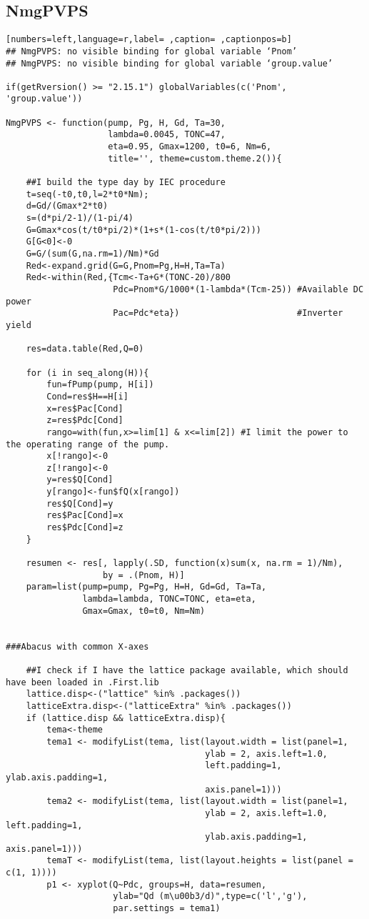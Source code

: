 \subsection{NmgPVPS}
\label{sec:org3b84132}
\begin{lstlisting}[numbers=left,language=r,label= ,caption= ,captionpos=b]
## NmgPVPS: no visible binding for global variable ‘Pnom’
## NmgPVPS: no visible binding for global variable ‘group.value’

if(getRversion() >= "2.15.1") globalVariables(c('Pnom', 'group.value'))

NmgPVPS <- function(pump, Pg, H, Gd, Ta=30,
                    lambda=0.0045, TONC=47,
                    eta=0.95, Gmax=1200, t0=6, Nm=6,
                    title='', theme=custom.theme.2()){

    ##I build the type day by IEC procedure
    t=seq(-t0,t0,l=2*t0*Nm);
    d=Gd/(Gmax*2*t0)
    s=(d*pi/2-1)/(1-pi/4)
    G=Gmax*cos(t/t0*pi/2)*(1+s*(1-cos(t/t0*pi/2)))
    G[G<0]<-0
    G=G/(sum(G,na.rm=1)/Nm)*Gd
    Red<-expand.grid(G=G,Pnom=Pg,H=H,Ta=Ta)
    Red<-within(Red,{Tcm<-Ta+G*(TONC-20)/800
                     Pdc=Pnom*G/1000*(1-lambda*(Tcm-25)) #Available DC power
                     Pac=Pdc*eta})                       #Inverter yield

    res=data.table(Red,Q=0)

    for (i in seq_along(H)){
        fun=fPump(pump, H[i])
        Cond=res$H==H[i]
        x=res$Pac[Cond]
        z=res$Pdc[Cond]
        rango=with(fun,x>=lim[1] & x<=lim[2]) #I limit the power to the operating range of the pump.
        x[!rango]<-0
        z[!rango]<-0
        y=res$Q[Cond]
        y[rango]<-fun$fQ(x[rango])
        res$Q[Cond]=y
        res$Pac[Cond]=x
        res$Pdc[Cond]=z
    }

    resumen <- res[, lapply(.SD, function(x)sum(x, na.rm = 1)/Nm),
                   by = .(Pnom, H)]
    param=list(pump=pump, Pg=Pg, H=H, Gd=Gd, Ta=Ta,
               lambda=lambda, TONC=TONC, eta=eta,
               Gmax=Gmax, t0=t0, Nm=Nm)


###Abacus with common X-axes

    ##I check if I have the lattice package available, which should have been loaded in .First.lib
    lattice.disp<-("lattice" %in% .packages())
    latticeExtra.disp<-("latticeExtra" %in% .packages())
    if (lattice.disp && latticeExtra.disp){
        tema<-theme
        tema1 <- modifyList(tema, list(layout.width = list(panel=1,
                                       ylab = 2, axis.left=1.0,
                                       left.padding=1, ylab.axis.padding=1,
                                       axis.panel=1)))
        tema2 <- modifyList(tema, list(layout.width = list(panel=1,
                                       ylab = 2, axis.left=1.0, left.padding=1,
                                       ylab.axis.padding=1, axis.panel=1)))
        temaT <- modifyList(tema, list(layout.heights = list(panel = c(1, 1))))
        p1 <- xyplot(Q~Pdc, groups=H, data=resumen,
                     ylab="Qd (m\u00b3/d)",type=c('l','g'),
                     par.settings = tema1)


\end{lstlisting}
